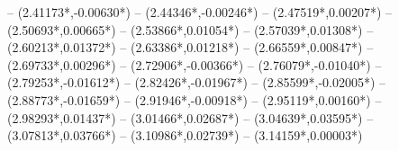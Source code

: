 {	-- ({2.41173*\dx},{-0.00630*\dy})
	-- ({2.44346*\dx},{-0.00246*\dy})
	-- ({2.47519*\dx},{0.00207*\dy})
	-- ({2.50693*\dx},{0.00665*\dy})
	-- ({2.53866*\dx},{0.01054*\dy})
	-- ({2.57039*\dx},{0.01308*\dy})
	-- ({2.60213*\dx},{0.01372*\dy})
	-- ({2.63386*\dx},{0.01218*\dy})
	-- ({2.66559*\dx},{0.00847*\dy})
	-- ({2.69733*\dx},{0.00296*\dy})
	-- ({2.72906*\dx},{-0.00366*\dy})
	-- ({2.76079*\dx},{-0.01040*\dy})
	-- ({2.79253*\dx},{-0.01612*\dy})
	-- ({2.82426*\dx},{-0.01967*\dy})
	-- ({2.85599*\dx},{-0.02005*\dy})
	-- ({2.88773*\dx},{-0.01659*\dy})
	-- ({2.91946*\dx},{-0.00918*\dy})
	-- ({2.95119*\dx},{0.00160*\dy})
	-- ({2.98293*\dx},{0.01437*\dy})
	-- ({3.01466*\dx},{0.02687*\dy})
	-- ({3.04639*\dx},{0.03595*\dy})
	-- ({3.07813*\dx},{0.03766*\dy})
	-- ({3.10986*\dx},{0.02739*\dy})
	-- ({3.14159*\dx},{0.00003*\dy})
}
\def\tabelleninhalt{
1& -0.270966& -0.271520& -0.271568& -0.271578& -0.271582& -0.271583\mathstrut\rlap{\raisebox{3pt}{\strut}}\\
2&           & -0.010363& -0.010441& -0.010451& -0.010453& -0.010454\mathstrut\\
3&           &           & -0.002235& -0.002260& -0.002264& -0.002265\mathstrut\\
4&           &           &           & -0.000813& -0.000823& -0.000825\mathstrut\\
5&           &           &           &           & -0.000382& -0.000387\mathstrut\\
6&           &           &           &           &           & -0.000209\mathstrut\\[3pt]
}
\def\steigungen{
1 &    -0.270966 \rlap{\raisebox{3pt}{\strut}}\\
2 &    -0.302608 \\
3 &    -0.314068 \\
4 &    -0.319920 \\
5 &    -0.323459 \\
6 &    -0.325827 \\[2pt]
\hline
\infty &    -0.337699 \rlap{\raisebox{3pt}{\strut}}\\[2pt]
}
